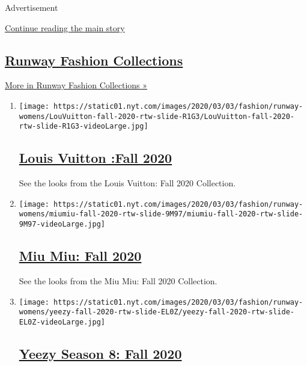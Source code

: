 Advertisement

\protect\hyperlink{after-mid1}{Continue reading the main story}

\hypertarget{runway-fashion-collections}{%
\subsection{\texorpdfstring{\href{/spotlight/fashion-runway-slideshows}{Runway
Fashion
Collections}}{Runway Fashion Collections}}\label{runway-fashion-collections}}

\href{/spotlight/fashion-runway-slideshows}{More in Runway Fashion
Collections »}

\begin{enumerate}
\def\labelenumi{\arabic{enumi}.}
\item
  \texttt{[image: https://static01.nyt.com/images/2020/03/03/fashion/runway-womens/LouVuitton-fall-2020-rtw-slide-R1G3/LouVuitton-fall-2020-rtw-slide-R1G3-videoLarge.jpg]}

  \hypertarget{louis-vuitton-fall-2020}{%
  \subsection{\texorpdfstring{\href{/slideshow/2020/03/03/fashion/runway-womens/louis-vuitton-fall-2020.html}{Louis
  Vuitton :Fall
  2020}}{Louis Vuitton :Fall 2020}}\label{louis-vuitton-fall-2020}}

  See the looks from the Louis Vuitton: Fall 2020 Collection.
\item
  \texttt{[image: https://static01.nyt.com/images/2020/03/03/fashion/runway-womens/miumiu-fall-2020-rtw-slide-9M97/miumiu-fall-2020-rtw-slide-9M97-videoLarge.jpg]}

  \hypertarget{miu-miu-fall-2020}{%
  \subsection{\texorpdfstring{\href{/slideshow/2020/03/03/fashion/runway-womens/miu-miu-fall-2020.html}{Miu
  Miu: Fall 2020}}{Miu Miu: Fall 2020}}\label{miu-miu-fall-2020}}

  See the looks from the Miu Miu: Fall 2020 Collection.
\item
  \texttt{[image: https://static01.nyt.com/images/2020/03/03/fashion/runway-womens/yeezy-fall-2020-rtw-slide-EL0Z/yeezy-fall-2020-rtw-slide-EL0Z-videoLarge.jpg]}

  \hypertarget{yeezy-season-8-fall-2020}{%
  \subsection{\texorpdfstring{\href{/slideshow/2020/03/03/fashion/runway-womens/yeezy-season-8-fall-2020.html}{Yeezy
  Season 8: Fall
  2020}}{Yeezy Season 8: Fall 2020}}\label{yeezy-season-8-fall-2020}}


\end{enumerate}
